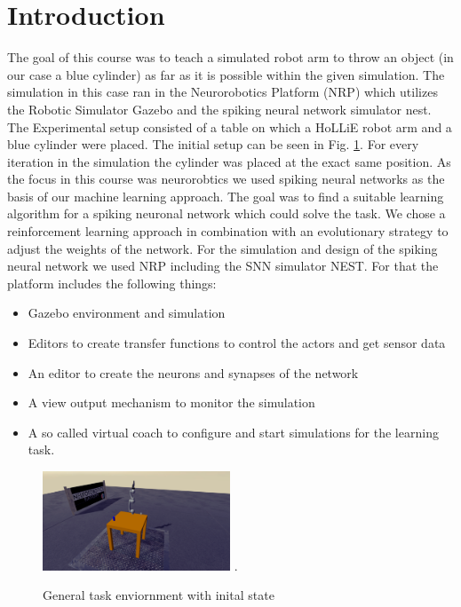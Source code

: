 \section{Introduction}
The goal of this course was to teach a simulated robot arm to throw an object (in our case a blue cylinder) as far as it is possible within the given simulation. The simulation in this case ran %
in the Neurorobotics Platform (NRP) which utilizes the Robotic Simulator Gazebo and the spiking neural network simulator nest.\\%
The Experimental setup consisted of a table on which a HoLLiE robot arm and a blue cylinder were placed.
The initial setup can be seen in Fig. \ref{init_state}. For every iteration in the simulation the cylinder was placed at the exact same position. 
As the focus in this course was neurorobtics we used spiking neural networks as the basis of our machine learning approach.  
The goal was to find a suitable learning algorithm for a spiking neuronal network which could solve the task. We chose a reinforcement learning approach in combination with an evolutionary strategy to adjust the weights of the network.
For the simulation and design of the spiking neural network we used NRP including the SNN simulator NEST. For that the platform includes the following things:
 \begin{itemize}
\item Gazebo environment and simulation
\item Editors to create transfer functions to control the actors and get sensor data
\item An editor to create the neurons and synapses of the network
\item A view output mechanism to monitor the simulation
\item A so called virtual coach to configure and start simulations for the learning task.
\end{itemize} 
\begin{figure}[H]
	\centering
	\includegraphics[width=2.2in]{img/init_state.png}
	\DeclareGraphicsExtensions.
	\caption{General task enviornment with inital state }
	\label{init_state}
\end{figure}

